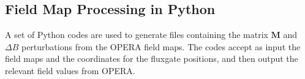 % 



\subsection{Field Map Processing in Python}

A set of Python codes are used to generate files containing the matrix
$\mathbf{M}$ and $\Delta B$ perturbations from the OPERA field maps.
The codes accept as input the field maps and the coordinates for the
fluxgate positions, and then output the relevant field values from
OPERA.







